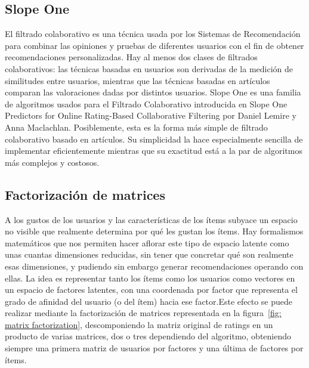  	\subsection{Slope One}
	El filtrado colaborativo es una técnica usada por los Sistemas de Recomendación para combinar las opiniones y pruebas de diferentes usuarios con el fin de obtener recomendaciones personalizadas. Hay al menos dos clases de filtrados colaborativos: las técnicas basadas en usuarios son derivadas de la medición de similitudes entre usuarios, mientras que las técnicas basadas en artículos comparan las valoraciones dadas por distintos usuarios. Slope One es una familia de algoritmos usados para el Filtrado Colaborativo introducida en Slope One Predictors for Online Rating-Based Collaborative Filtering por Daniel Lemire y Anna Maclachlan. Posiblemente, esta es la forma más simple de filtrado colaborativo basado en artículos. Su simplicidad la hace especialmente sencilla de implementar eficientemente mientras que su exactitud está a la par de algoritmos más complejos y costosos.\cite{42}
 	
 	\subsection{Factorización de matrices}
 		A los gustos de los usuarios y las características de los ítems subyace un espacio no visible que realmente determina por qué les gustan los ítems. Hay formalismos matemáticos que nos permiten hacer aflorar este tipo de espacio latente como unas cuantas dimensiones reducidas, sin tener que concretar qué son realmente esas dimensiones, y pudiendo sin embargo generar recomendaciones operando con ellas. La idea es representar tanto los ítems como los usuarios como vectores en un espacio de factores latentes, con una coordenada por factor que representa el grado de afinidad del usuario (o del ítem) hacia ese factor.Este efecto se puede realizar mediante la factorización de matrices representada en la figura~\ref{fig: matrix factorization}, descomponiendo la matriz original de ratings en un producto de varias matrices, dos o tres dependiendo del algoritmo, obteniendo siempre una primera matriz de usuarios por factores y una última de factores por ítems.\cite{43}

